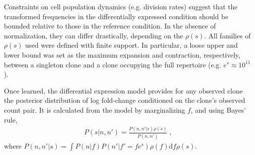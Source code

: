 \documentclass[letterpaper,english,prl,reprint,longbibliography]{revtex4-1} %
\begin{document}
Constraints on cell population dynamics (e.g. division rates) suggest that the transformed frequencies in the differentially expressed condition should be bounded relative to those in the reference condition. 
In the absence of normalization, they can differ drastically, depending on the $\rho(s)$. All families of $\rho(s)$ used were defined with finite support. In particular, a loose upper and lower bound was set as the maximum expansion and contraction, respectively, between a singleton clone and a clone occupying the full repertoire (e.g. $e^s\approx 10^11$).  


Once learned, the differential expression model provides for any observed clone the posterior distribution of log fold-change conditioned on the clone's observed count pair. 
It is calculated from the model by marginalizing $f$, and using Bayes' rule, 
\begin{align}
	P(s|n,n')=\frac{P(n,n'|s)\rho(s)}{P(n,n')}\;,
\end{align}
where $P(n,n'|s)=\int P(n|f)P(n'|f'=fe^s)\rho(f)\textrm{d}f\rho(s)$. 
\end{document}
